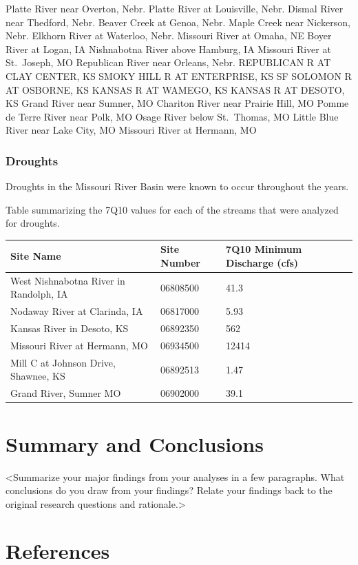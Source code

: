\documentclass[12pt,]{article}
\begin{document}
Platte River near Overton, Nebr. Platte River at Louisville, Nebr.
Dismal River near Thedford, Nebr. Beaver Creek at Genoa, Nebr. Maple
Creek near Nickerson, Nebr. Elkhorn River at Waterloo, Nebr. Missouri
River at Omaha, NE Boyer River at Logan, IA Nishnabotna River above
Hamburg, IA Missouri River at St.~Joseph, MO Republican River near
Orleans, Nebr. REPUBLICAN R AT CLAY CENTER, KS SMOKY HILL R AT
ENTERPRISE, KS SF SOLOMON R AT OSBORNE, KS KANSAS R AT WAMEGO, KS KANSAS
R AT DESOTO, KS Grand River near Sumner, MO Chariton River near Prairie
Hill, MO Pomme de Terre River near Polk, MO Osage River below
St.~Thomas, MO Little Blue River near Lake City, MO Missouri River at
Hermann, MO

\hypertarget{droughts}{%
\subsubsection{Droughts}\label{droughts}}

Droughts in the Missouri River Basin were known to occur throughout the
years.

Table summarizing the 7Q10 values for each of the streams that were
analyzed for droughts.

\begin{longtable}[]{@{}lll@{}}
\toprule
Site Name & Site Number & 7Q10 Minimum Discharge (cfs)\tabularnewline
\midrule
\endhead
West Nishnabotna River in Randolph, IA & 06808500 & 41.3\tabularnewline
Nodaway River at Clarinda, IA & 06817000 & 5.93\tabularnewline
Kansas River in Desoto, KS & 06892350 & 562\tabularnewline
Missouri River at Hermann, MO & 06934500 & 12414\tabularnewline
Mill C at Johnson Drive, Shawnee, KS & 06892513 & 1.47\tabularnewline
Grand River, Sumner MO & 06902000 & 39.1\tabularnewline
\bottomrule
\end{longtable}

\newpage

\hypertarget{summary-and-conclusions}{%
\section{Summary and Conclusions}\label{summary-and-conclusions}}

\textless Summarize your major findings from your analyses in a few
paragraphs. What conclusions do you draw from your findings? Relate your
findings back to the original research questions and
rationale.\textgreater{}

\newpage

\hypertarget{references}{%
\section*{References}\label{references}}
\end{document}
